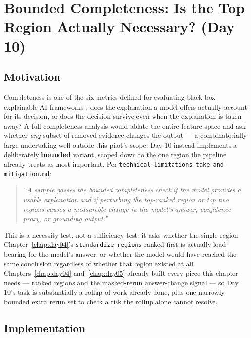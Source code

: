 \chapter{Bounded Completeness: Is the Top Region Actually Necessary? (Day 10)}
\label{chap:day10}

\section{Motivation}

Completeness is one of the six metrics defined for evaluating black-box explainable-AI frameworks
\citep{arreche2024exai}: does the explanation a model offers actually account for its decision, or
does the decision survive even when the explanation is taken away? A full completeness analysis would
ablate the entire feature space and ask whether \emph{any} subset of removed evidence changes the
output --- a combinatorially large undertaking well outside this pilot's scope. Day 10 instead
implements a deliberately \textbf{bounded} variant, scoped down to the one region the pipeline already
treats as most important. Per \texttt{technical-limitations-take-and-mitigation.md}:

\begin{quote}
\itshape ``A sample passes the bounded completeness check if the model provides a usable explanation
and if perturbing the top-ranked region or top two regions causes a measurable change in the model's
answer, confidence proxy, or grounding output.''
\end{quote}

This is a necessity test, not a sufficiency test: it asks whether the single region
Chapter~\ref{chap:day04}'s \texttt{standardize\_regions} ranked first is actually load-bearing for the
model's answer, or whether the model would have reached the same conclusion regardless of whether that
region existed at all. Chapters~\ref{chap:day04} and~\ref{chap:day05} already built every piece this
chapter needs --- ranked regions and the masked-rerun answer-change signal --- so Day 10's task is
substantially a rollup of work already done, plus one narrowly bounded extra rerun set to check a risk
the rollup alone cannot resolve.

\section{Implementation}

